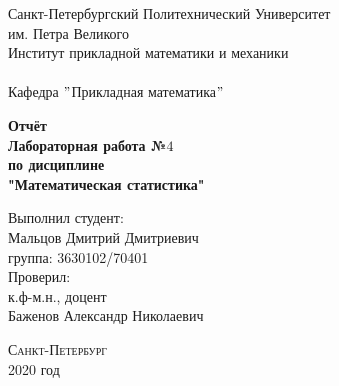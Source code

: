 \documentclass[a4]{article}
\begin{document}
	\def\contentsname{\LARGE{Содержание}}
	\thispagestyle{empty}
	\begin{center} 
		\vspace{2cm} 
		{\Large \sc Санкт-Петербургский Политехнический Университет}\\
		\vspace{2mm}
		{\Large\sc им. Петра Великого}\\
		\vspace{1cm}
		{\large \sc Институт прикладной математики и механики\\ 
			\vspace{0.5mm}
			\textsc{}}\\ 
		\vspace{0.5mm}
		{\large\sc Кафедра $"$Прикладная математика$"$}\\
		\vspace{15mm}
		
		
		{\sc \textbf{Отчёт\\
			Лабораторная работа №$4$\\
			по дисциплине\\
			"Математическая статистика"}
			\vspace{6mm}
			
		}
		\vspace*{2mm}
		
		
		\begin{flushleft}
			\vspace{4cm}
			\sc Выполнил студент:\\
			\sc Мальцов Дмитрий Дмитриевич\\
			\sc группа: 3630102/70401\\
			\vspace{1cm}
			\sc Проверил:\\
			\sc к.ф-м.н., доцент\\
			\sc Баженов Александр Николаевич
			\vspace{20mm}
		\end{flushleft}
	\end{center} 
	\begin{center}
		\vfill {\large\textsc{Санкт-Петербург}}\\ 
		2020 год
	\end{center}
	
	\newpage
	\pagestyle{plain}
	
	
	
\end{document}
